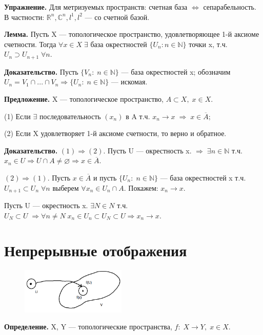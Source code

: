 \documentclass[12pt,a4paper]{article}
\begin{document}
\textbf{Упражнение.} Для метризуемых пространств: счетная база $\Leftrightarrow$ сепарабельность. В частности: $\mathbb{R}^n, \mathbb{C}^n, l^{1}, l^{2}$ --- со счетной базой. 

\textbf{Лемма.} Пусть X --- топологическое пространство, удовлетворяющее 1-й аксиоме счетности. Тогда $\forall x \in X\; \exists$ база окрестностей $\{U_{n}: n \in \mathbb{N}\}$ точки x, т.ч. $U_{n} \supset U_{n + 1} \; \forall n.$

\textbf{Доказательство.} Пусть $\{V_{n}: \; n \in \mathbb{N}\}$ --- база окрестностей x; обозначим $U_{n} = V_{1} \cap ... \cap V_{n} \Rightarrow \{U_{n}: \; n \in \mathbb{N}\}$ --- искомая. 

\textbf{Предложение.} X --- топологическое пространство, $A \subset X, \; x \in X.$ 

(1) Если $\exists$ последовательность $(x_{n})$ в A т.ч. $x_{n} \to x \; \Rightarrow \; x \in \overline{A};$ 

(2) Если X удовлетворяет 1-й аксиоме счетности, то верно и обратное. 

\textbf{Доказательство.} $(1) \Rightarrow (2).$ Пусть U --- окрестность x. $\Rightarrow \; \exists n \in \mathbb{N}$ т.ч. $x_{n} \in U \Rightarrow U \cap A \neq \varnothing \Rightarrow x \in \overline{A}.$ 

$(2) \Rightarrow (1).$ Пусть $x \in \overline{A}$ и пусть $\{U_{n}\!\!: \; n \in \mathbb{N}\}$ --- база окрестностей x т.ч. $U_{n + 1} \subset U_{n} \; \forall n$ выберем $\forall x_{n} \in U_{n} \cap A.$ Покажем: $x_{n} \to x.$ 

Пусть U --- окрестность x. $\exists N \in N$ т.ч. $U_{N} \subset U \; \Rightarrow \forall n \neq N \; x_{n} \in U_{n} \subset U_{N} \subset U \Rightarrow x_{n} \to x.$

\section{Непрерывные отображения} 

\begin{figure}
	\includegraphics[width = 5cm]{lect4_3.png}
\end{figure}

\textbf{Определение.} X, Y --- топологические пространства, $f: \; X \to Y, \; x \in X.$ 
\end{document}
